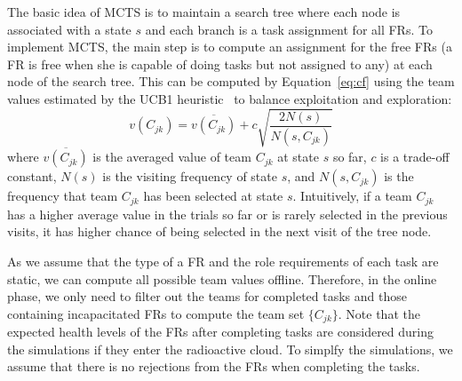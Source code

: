 The basic idea of MCTS is to maintain a search tree where each node
is associated with a state $s$ and each branch is a task assignment
for all FRs. To implement MCTS, the main step is to compute
an assignment for the free FRs (a FR is free when she
is capable of doing tasks but not assigned to any) at each
node of the search tree. This can be computed by
Equation~\ref{eq:cf} using the team values estimated by the UCB1
heuristic~\cite{auer2002finite} to balance exploitation and
exploration:
\begin{equation}
  v(C_{jk}) = \overline{v(C_{jk})} + c\sqrt{\frac{2N(s)}{N(s, C_{jk})}}
\end{equation}
where $\overline{v(C_{jk})}$ is the averaged value of team $C_{jk}$
at state $s$ so far, $c$ is a trade-off constant, $N(s)$ is the
visiting frequency of state $s$, and $N(s, C_{jk})$ is the
frequency that team $C_{jk}$ has been selected at state $s$.
Intuitively, if a team $C_{jk}$ has  a higher average value in the
trials so far or is rarely selected in the previous visits, it has
higher chance of being selected in the next visit of the tree node.

As we assume that the type of a FR and the role requirements
of each task are static, we can compute all possible team values
offline. Therefore, in the online phase, we only need to filter out
the teams for completed tasks and those containing
incapacitated FRs to compute the team set $\{ C_{jk} \}$. Note that the 
expected health levels of the FRs after completing tasks are considered
during the simulations if they enter the radioactive cloud. To simplfy the
simulations, we assume that there is no rejections from the FRs when 
completing the tasks. 

